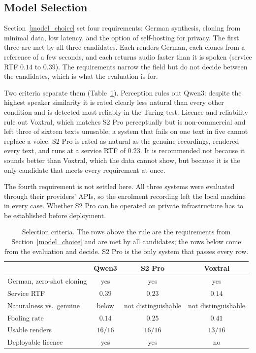 \subsection{Model Selection}
\label{model_selection}

Section~\ref{model_choice} set four requirements: German synthesis, cloning from
minimal data, low latency, and the option of self-hosting for privacy. The first
three are met by all three candidates. Each renders German, each clones from a
reference of a few seconds, and each returns audio faster than it is spoken
(service RTF $0.14$ to $0.39$). The requirements narrow the field but do not
decide between the candidates, which is what the evaluation is for.

Two criteria separate them (Table~\ref{tab:model_selection}). Perception rules
out Qwen3: despite the highest speaker similarity it is rated clearly less
natural than every other condition and is detected most reliably in the Turing
test. Licence and reliability rule out Voxtral, which matches S2 Pro
perceptually but is non-commercial and left three of sixteen texts unusable; a
system that fails on one text in five cannot replace a voice. S2 Pro is rated as
natural as the genuine recordings, rendered every text, and runs at a service
RTF of $0.23$. It is recommended not because it sounds better than Voxtral,
which the data cannot show, but because it is the only candidate that meets
every requirement at once.

The fourth requirement is not settled here. All three systems were evaluated
through their providers' APIs, so the enrolment recording left the local machine
in every case. Whether S2 Pro can be operated on private infrastructure has to
be established before deployment.

\begin{table}[H]
    \centering
    \small
    \begin{tabular}{lccc}
        \toprule
         & \textbf{Qwen3} & \textbf{S2 Pro} & \textbf{Voxtral} \\
        \midrule
        German, zero-shot cloning & yes     & yes                 & yes \\
        Service RTF               & $0.39$  & $0.23$              & $0.14$ \\
        \midrule
        Naturalness vs.\ genuine  & below   & not distinguishable & not distinguishable \\
        Fooling rate              & $0.14$  & $0.25$              & $0.41$ \\
        Usable renders            & $16/16$ & $16/16$             & $13/16$ \\
        Deployable licence        & yes     & yes                 & no \\
        \bottomrule
    \end{tabular}
    \caption{Selection criteria. The rows above the rule are the requirements
    from Section~\ref{model_choice} and are met by all candidates; the rows
    below come from the evaluation and decide. S2 Pro is the only system that
    passes every row.}
    \label{tab:model_selection}
\end{table}
